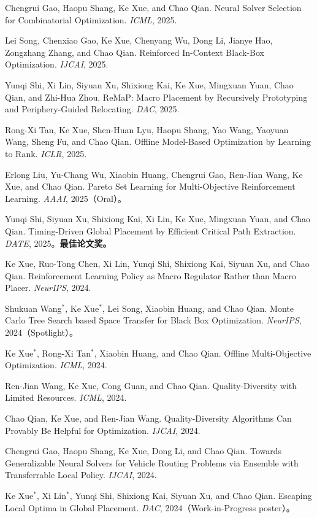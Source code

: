 \documentclass[10pt,a4paper,fontset=fandol]{ctexart}
\begin{document}
\begin{cvbullet}
  \item Chengrui Gao, Haopu Shang, Ke Xue, and Chao Qian. Neural Solver Selection for Combinatorial Optimization. \textit{ICML}, 2025.
  \item Lei Song, Chenxiao Gao, Ke Xue, Chenyang Wu, Dong Li, Jianye Hao, Zongzhang Zhang, and Chao Qian. Reinforced In-Context Black-Box Optimization. \textit{IJCAI}, 2025.
  \item Yunqi Shi, Xi Lin, Siyuan Xu, Shixiong Kai, Ke Xue, Mingxuan Yuan, Chao Qian, and Zhi-Hua Zhou. ReMaP: Macro Placement by Recursively Prototyping and Periphery-Guided Relocating. \textit{DAC}, 2025.
  \item Rong-Xi Tan, Ke Xue, Shen-Huan Lyu, Haopu Shang, Yao Wang, Yaoyuan Wang, Sheng Fu, and Chao Qian. Offline Model-Based Optimization by Learning to Rank. \textit{ICLR}, 2025.
  \item Erlong Liu, Yu-Chang Wu, Xiaobin Huang, Chengrui Gao, Ren-Jian Wang, Ke Xue, and Chao Qian. Pareto Set Learning for Multi-Objective Reinforcement Learning. \textit{AAAI}, 2025（Oral）。
  \item Yunqi Shi, Siyuan Xu, Shixiong Kai, Xi Lin, Ke Xue, Mingxuan Yuan, and Chao Qian. Timing-Driven Global Placement by Efficient Critical Path Extraction. \textit{DATE}, 2025。\textbf{最佳论文奖。}
  \item Ke Xue, Ruo-Tong Chen, Xi Lin, Yunqi Shi, Shixiong Kai, Siyuan Xu, and Chao Qian. Reinforcement Learning Policy as Macro Regulator Rather than Macro Placer. \textit{NeurIPS}, 2024.
  \item Shukuan Wang$^*$, Ke Xue$^*$, Lei Song, Xiaobin Huang, and Chao Qian. Monte Carlo Tree Search based Space Transfer for Black Box Optimization. \textit{NeurIPS}, 2024（Spotlight）。
  \item Ke Xue$^*$, Rong-Xi Tan$^*$, Xiaobin Huang, and Chao Qian. Offline Multi-Objective Optimization. \textit{ICML}, 2024.
  \item Ren-Jian Wang, Ke Xue, Cong Guan, and Chao Qian. Quality-Diversity with Limited Resources. \textit{ICML}, 2024.
  \item Chao Qian, Ke Xue, and Ren-Jian Wang. Quality-Diversity Algorithms Can Provably Be Helpful for Optimization. \textit{IJCAI}, 2024.
  \item Chengrui Gao, Haopu Shang, Ke Xue, Dong Li, and Chao Qian. Towards Generalizable Neural Solvers for Vehicle Routing Problems via Ensemble with Transferrable Local Policy. \textit{IJCAI}, 2024.
  \item Ke Xue$^*$, Xi Lin$^*$, Yunqi Shi, Shixiong Kai, Siyuan Xu, and Chao Qian. Escaping Local Optima in Global Placement. \textit{DAC}, 2024（Work-in-Progress poster）。

\end{cvbullet}
\end{document}

